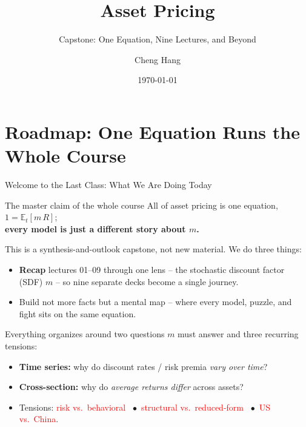 \documentclass{beamer}
\title[Asset Pricing]{\textbf{Asset Pricing}} %
\subtitle{Capstone: One Equation, Nine Lectures, and Beyond}
\author[Cheng Hang]{Cheng Hang} %
\institute[DUFE] 
{School of Fintech \\
Dongbei University of Finance \& Economics \\ 
\medskip
\textbf{chenghangch@qq.com}
}
\date{\today}
\newcommand{\E}{\mathbb{E}}
\begin{document}
\begin{frame}
\titlepage %
\end{frame}

\section{Roadmap: One Equation Runs the Whole Course}

\begin{frame}{Welcome to the Last Class: What We Are Doing Today}
\begin{block}{The master claim of the whole course}
\centering\large All of asset pricing is one equation, $1 = \E_t[m\,R]$; \\[2pt]
\textbf{every model is just a different story about $m$.}
\end{block}
\justifying
This is a \alert{synthesis-and-outlook} capstone, not new material. We do three things:
\vspace{-1.5em}
\begin{itemize}
  \item \textbf{Recap} lectures 01--09 through \alert{one lens} -- the stochastic discount factor (SDF) $m$ -- so nine separate decks become a single journey.
  \item Build not more facts but a \alert{mental map} -- where every model, puzzle, and fight sits on the same equation.
\end{itemize}
Everything organizes around \alert{two questions $m$ must answer} and \alert{three recurring tensions}:
\begin{itemize}
  \item \textbf{Time series:} why do discount rates / risk premia \textit{vary over time}?
  \item \textbf{Cross-section:} why do \textit{average returns differ} across assets?
  \item Tensions: \textcolor{red}{risk vs.\ behavioral} \ $\bullet$\ \textcolor{red}{structural vs.\ reduced-form} \ $\bullet$\ \textcolor{red}{US vs.\ China}.
\end{itemize}
\end{frame}
\end{document}
